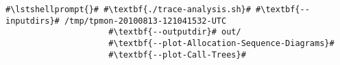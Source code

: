 \begin{lstlisting}[caption=Commands to produce the diagrams under \UnixLikeSystems,label=lst:traceAnalysis:sequenceDiagram]
#\lstshellprompt{}# #\textbf{./trace-analysis.sh}# #\textbf{--inputdirs}# /tmp/tpmon-20100813-121041532-UTC
                     #\textbf{--outputdir}# out/
                     #\textbf{--plot-Allocation-Sequence-Diagrams}#
                     #\textbf{--plot-Call-Trees}#							 
\end{lstlisting}
